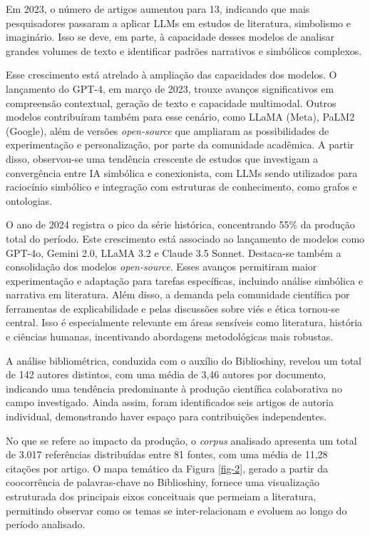 \documentclass[portuguese]{textolivre}
\begin{document}
Em 2023, o número de artigos aumentou para 13, indicando que mais pesquisadores passaram a aplicar LLMs em estudos de literatura, simbolismo e imaginário. Isso se deve, em parte, à capacidade desses modelos de analisar grandes volumes de texto e identificar padrões narrativos e simbólicos complexos.

Esse crescimento está atrelado à ampliação das capacidades dos modelos. O lançamento do GPT-4, em março de 2023, trouxe avanços significativos em compreensão contextual, geração de texto e capacidade multimodal. Outros modelos contribuíram também para esse cenário, como LLaMA (Meta), PaLM2 (Google), além de versões \textit{open-source} que ampliaram as possibilidades de experimentação e personalização, por parte da comunidade acadêmica. A partir disso, observou-se uma tendência crescente de estudos que investigam a convergência entre IA simbólica e conexionista, com LLMs sendo utilizados para raciocínio simbólico e integração com estruturas de conhecimento, como grafos e ontologias.

O ano de 2024 registra o pico da série histórica, concentrando 55\% da produção total do período. Este crescimento está associado ao lançamento de modelos como GPT-4o, Gemini 2.0, LLaMA 3.2 e Claude 3.5 Sonnet. Destaca-se também a consolidação dos modelos \textit{open-source}. Esses avanços permitiram maior experimentação e adaptação para tarefas específicas, incluindo análise simbólica e narrativa em literatura. Além disso, a demanda pela comunidade científica por ferramentas de explicabilidade e pelas discussões sobre viés e ética tornou-se central. Isso é especialmente relevante em áreas sensíveis como literatura, história e ciências humanas, incentivando abordagens metodológicas mais robustas.

A análise bibliométrica, conduzida com o auxílio do Biblioshiny, revelou um total de 142 autores distintos, com uma média de 3,46 autores por documento, indicando uma tendência predominante à produção científica colaborativa no campo investigado. Ainda assim, foram identificados seis artigos de autoria individual, demonstrando haver espaço para contribuições independentes.

No que se refere ao impacto da produção, o \textit{corpus} analisado apresenta um total de 3.017 referências distribuídas entre 81 fontes, com uma média de 11,28 citações por artigo. O mapa temático da Figura \ref{fig-2}, gerado a partir da coocorrência de palavras-chave no Biblioshiny, fornece uma visualização estruturada dos principais eixos conceituais que permeiam a literatura, permitindo observar como os temas se inter-relacionam e evoluem ao longo do período analisado.
\end{document}
